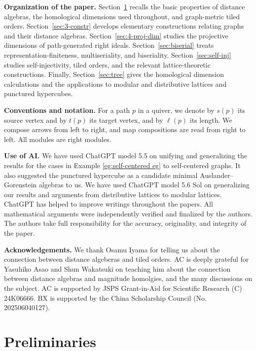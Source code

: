 \documentclass[a4paper,leqno]{amsart}
\begin{document}
\medskip
\noindent
\textbf{Organization of the paper.}
Section~\ref{sec:2} recalls the basic properties of distance algebras, the homological dimensions used throughout, and graph-metric tiled orders.  Section~\ref{sec:3-constr} develops elementary constructions relating graphs and their distance algebras.  Section~\ref{sec:4-proj-dim} studies the projective dimensions of path-generated right ideals.  Section~\ref{sec:biserial} treats representation-finiteness,
multiseriality, and biseriality.  Section~\ref{sec:self-inj} studies
self-injectivity, tiled orders, and the relevant lattice-theoretic
constructions.  Finally, Section~\ref{sec:tree} gives the homological dimension calculations and the applications to modular and distributive lattices and punctured hypercubes.

\medskip
\noindent
{\bf Conventions and notation.}
For a path $p$ in a quiver, we denote by $s(p)$ its source vertex and by $t(p)$ its target vertex, and by $\ell(p)$ its length. We compose arrows from left to right, and map compositions are read from right to left. All modules are right modules.


\medskip
\noindent
\textbf{Use of AI.}
We have used ChatGPT model 5.5 on unifying and generalizing the results for the cases in Example \ref{eg:self-centered eg} to self-centered graphs.  It also suggested the punctured hypercube as a candidate minimal Auslander--Gorenstein algebras to us.  We have used ChatGPT model 5.6 Sol on generalizing our results and arguments from distributive lattices to modular lattices.
ChatGPT has helped to improve writings throughout the papers.  All mathematical arguments were independently verified and finalized by the authors. 
The authors take full responsibility for the accuracy, originality, and integrity of the paper.

\medskip
\noindent
\textbf{Acknowledgements.}
We thank Osamu Iyama for telling us about the connection between distance algeberas and tiled orders.  AC is deeply grateful for Yasuhiko Asao and Shun Wakatsuki on teaching him about the connection between distance algebras and magnitude homolgies, and the many discussions on the subject.
AC is supported by JSPS Grant-in-Aid for Scientific Research (C) 24K06666. BX is supported by the China Scholarship Council (No. 202506040127).

\section{Preliminaries}\label{sec:2}
\end{document}
